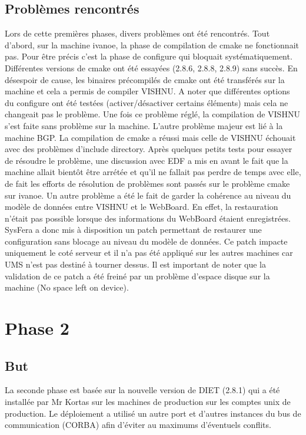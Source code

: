 \documentclass{article}
\begin{document}
\subsection{Probl\`emes rencontr\'es}
Lors de cette premi\`eres phases, divers probl\`emes ont \'et\'e rencontr\'es.
Tout d'abord, sur la machine ivanoe, la phase de compilation de cmake ne 
fonctionnait pas. Pour \^etre pr\'ecis c'est la phase de configure qui bloquait
syst\'ematiquement. Diff\'erentes versions de cmake ont \'et\'e essay\'ees (2.8.6,
2.8.8, 2.8.9) sans succ\`es. En d\'esespoir de cause, les binaires
pr\'ecompil\'es de cmake ont \'et\'e transf\'er\'es sur la machine et
cela a permis de compiler VISHNU. A noter que diff\'erentes options du
configure ont \'et\'e test\'ees (activer/d\'esactiver certains \'el\'ements)
mais cela ne changeait pas le probl\`eme. Une fois ce probl\`eme r\'egl\'e,
la compilation de VISHNU s'est faite sans probl\`eme sur la machine.
L'autre probl\`eme majeur est li\'e \`a la machine BGP. La compilation de 
cmake a r\'eussi mais celle de VISHNU \'echouait avec des probl\`emes d'include
directory. Apr\`es quelques petits tests pour essayer de r\'esoudre
le probl\`eme, une discussion avec EDF a mis en avant le fait que la machine
allait bient\^ot \^etre arr\'et\'ee et qu'il ne fallait pas perdre
de temps avec elle, de fait les efforts de r\'esolution de probl\`emes
sont pass\'es sur le probl\`eme cmake sur ivanoe.
Un autre probl\`eme a \'et\'e le fait de garder la cohérence au niveau du modèle de données entre
VISHNU et le WebBoard. En effet, la restauration n'était pas possible lorsque des informations du WebBoard étaient enregistrées. SysFera
a donc mis à disposition un patch permettant de restaurer une configuration sans blocage au niveau du modèle de données. Ce patch impacte uniquement le cot\'e serveur et il n'a pas \'et\'e
appliqu\'e sur les autres machines car UMS n'est pas destin\'e \`a tourner 
dessus. Il est important de noter que la validation de ce patch a \'et\'e freiné par un probl\`eme d'espace disque sur la machine (No space left on device).

\section{Phase 2}
\subsection{But}
La seconde phase est bas\'ee sur la nouvelle version de DIET (2.8.1)
qui a \'et\'e install\'ee par Mr Kortas sur les machines de 
production sur les comptes unix de production. Le déploiement a utilis\'e
un autre port et d'autres instances du bus de communication (CORBA)
afin d'\'eviter au maximums d'\'eventuels conflits.
\end{document}
